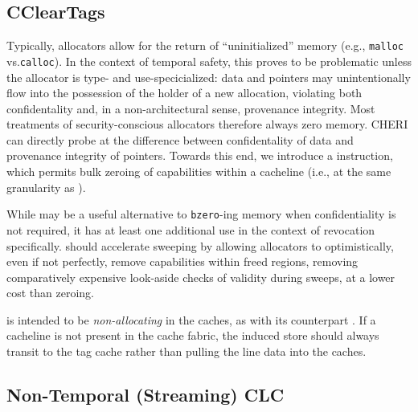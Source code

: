 \subsection{CClearTags} %

Typically, allocators allow for the return of ``uninitialized'' memory
(e.g., \texttt{malloc} vs.\@ \texttt{calloc}).  In the context of temporal
safety, this proves to be problematic unless the allocator is type- and
use-specicialized: data and pointers may unintentionally flow into the
possession of the holder of a new allocation, violating both confidentality
and, in a non-architectural sense, provenance integrity.  Most treatments of
security-conscious allocators therefore always zero memory.  CHERI can
directly probe at the difference between confidentality of data and
provenance integrity of pointers.  Towards this end, we introduce a
 instruction, which permits bulk zeroing of
capabilities within a cacheline (i.e., at the same granularity as
).

While  may be a useful alternative to
\texttt{bzero}-ing memory when confidentiality is not required, it has at
least one additional use in the context of revocation specifically.
 should accelerate sweeping by allowing allocators
to optimistically, even if not perfectly, remove capabilities within freed
regions, removing comparatively expensive look-aside checks of validity
during sweeps, at a lower cost than zeroing.

 is intended to be \emph{non-allocating} in the caches,
as with its counterpart .  If a cacheline is not present
in the cache fabric, the induced store should always transit to the tag cache
rather than pulling the line data into the caches.


\subsection{Non-Temporal (Streaming) CLC} %
\label{app:exp:clcnt}

